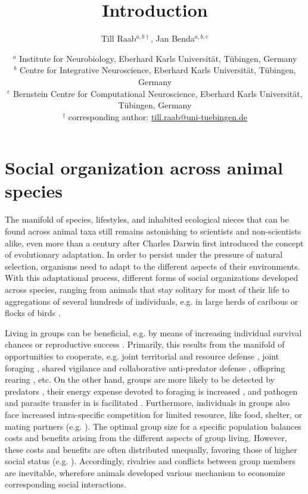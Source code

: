 \documentclass[11pt,pdftex]{article}
\title{Introduction}
\author{Till Raab$^{a,b\dagger}$, Jan Benda$^{a,b,c}$}
\date{\normalsize $^a$ Institute for Neurobiology, Eberhard Karls Universit\"at, T\"ubingen, Germany\\
  $^b$ Centre for Integrative Neuroscience, Eberhard Karls Universit\"at, T\"ubingen, Germany\\
  $^c$ Bernstein Centre for Computational Neuroscience, Eberhard Karls Universit\"at, T\"ubingen, Germany\\
$^{\dagger}$ corresponding author: \url{till.raab@uni-tuebingen.de}
}
\begin{document}

\maketitle

%
%

\section{Social organization across animal species}
\label{social_organization}

The manifold of species, lifestyles, and inhabited ecological nieces that can be found across animal taxa still remains astonishing to scientists and non-scientists alike, even more than a century after Charles Darwin first introduced the concept of evolutionary adaptation. In order to persist under the pressure of natural selection, organisms need to adapt to the different aspects of their environments. With this adaptational process, different forms of social organizations developed across species, ranging from animals that stay solitary for most of their life \citep{Cigliano1993, Cornhill2020} to aggregations of several hundreds of individuals, e.g. in large herds of caribous or flocks of birds \citep{Nagy2010, Torney2018}. 

Living in groups can be beneficial, e.g. by means of increasing individual survival chances or reproductive success \citep{Clutton-Brock1999, Sword2005, Bilde2007}. Primarily, this results from the manifold of opportunities to cooperate, e.g. joint territorial and resource defense \citep{Geffen1996, Markham2017}, joint foraging \citep{Hojesjo1998}, shared vigilance and collaborative anti-predator defense \citep{Chivers1995, Clutton-Brock1999, Barber2000, Hass2002, Sword2005}, offspring rearing \citep{DeWoody2000}, etc. On the other hand, groups are more likely to be detected by predators \citep{Cote1995}, their energy expense devoted to foraging is increased \citep{Korstjens2006}, and pathogen and parasite transfer in is facilitated \citep{Chapman1995, Cote1995}. Furthermore, individuals in groups also face increased intra-specific competition for limited resource, like food, shelter, or mating partners (e.g. \citealp{Cluttonbrock1979, Janson1985}). The optimal group size for a specific population balances costs and benefits arising from the different aspects of group living. However, these costs and benefits are often distributed unequally, favoring those of higher social status (e.g. \citealp{Janson1985, Wauters1992, Kappeler2008}). Accordingly, rivalries and conflicts between group members are inevitable, wherefore animals developed various mechanism to economize corresponding social interactions.
\end{document}
